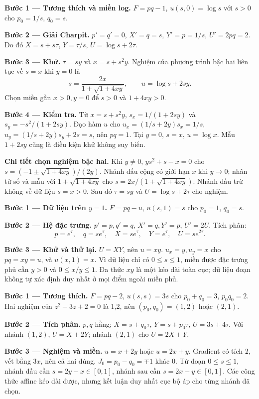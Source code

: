 \textbf{Bước 1 — Tương thích và miền log.} $F=pq-1$, $u(s,0)=\log s$ với $s>0$ cho $p_0=1/s$, $q_0=s$.

\textbf{Bước 2 — Giải Charpit.} $p'=q'=0$, $X'=q=s$, $Y'=p=1/s$, $U'=2pq=2$. Do đó $X=s+s\tau$, $Y=\tau/s$, $U=\log s+2\tau$.

\textbf{Bước 3 — Khử.} $\tau=sy$ và $x=s+s^2y$. Nghiệm của phương trình bậc hai liên tục về $s=x$ khi $y=0$ là
\[s=\frac{2x}{1+\sqrt{1+4xy}},\qquad u=\log s+2sy.\]
Chọn miền gần $x>0,y=0$ để $s>0$ và $1+4xy>0$.

\textbf{Bước 4 — Kiểm tra.} Từ $x=s+s^2y$, $s_x=1/(1+2sy)$ và $s_y=-s^2/(1+2sy)$. Đạo hàm $u$ cho $u_x=(1/s+2y)s_x=1/s$, $u_y=(1/s+2y)s_y+2s=s$, nên $pq=1$. Tại $y=0$, $s=x$, $u=\log x$. Mẫu $1+2sy$ cũng là điều kiện khử không suy biến.

\textbf{Chi tiết chọn nghiệm bậc hai.} Khi $y\ne0$, $ys^2+s-x=0$ cho $s=(-1\pm\sqrt{1+4xy})/(2y)$. Nhánh dấu cộng có giới hạn $x$ khi $y\to0$; nhân tử số và mẫu với $1+\sqrt{1+4xy}$ cho $s=2x/(1+\sqrt{1+4xy})$. Nhánh dấu trừ không về dữ liệu $s=x>0$. Sau đó $\tau=sy$ và $U=\log s+2\tau$ cho nghiệm.

\textbf{Bước 1 — Dữ liệu trên $y=1$.} $F=pq-u$, $u(s,1)=s$ cho $p_0=1$, $q_0=s$.

\textbf{Bước 2 — Hệ đặc trưng.} $p'=p,q'=q$, $X'=q,Y'=p$, $U'=2U$. Tích phân:
\[p=e^\tau,\quad q=se^\tau,\quad X=se^\tau,\quad Y=e^\tau,\quad U=se^{2\tau}.\]

\textbf{Bước 3 — Khử và thử lại.} $U=XY$, nên $u=xy$. $u_x=y,u_y=x$ cho $pq=xy=u$, và $u(x,1)=x$. Vì dữ liệu chỉ có $0\le s\le1$, miền được đặc trưng phủ cần $y>0$ và $0\le x/y\le1$. Đa thức $xy$ là một kéo dài toàn cục; dữ liệu đoạn không tự xác định duy nhất ở mọi điểm ngoài miền phủ.

\textbf{Bước 1 — Tương thích.} $F=pq-2$, $u(s,s)=3s$ cho $p_0+q_0=3$, $p_0q_0=2$. Hai nghiệm của $z^2-3z+2=0$ là 1,2, nên $(p_0,q_0)=(1,2)$ hoặc $(2,1)$.

\textbf{Bước 2 — Tích phân.} $p,q$ hằng; $X=s+q_0\tau$, $Y=s+p_0\tau$, $U=3s+4\tau$. Với nhánh $(1,2)$, $U=X+2Y$; nhánh $(2,1)$ cho $U=2X+Y$.

\textbf{Bước 3 — Nghiệm và miền.} $u=x+2y$ hoặc $u=2x+y$. Gradient có tích 2, vết bằng $3x$, nên cả hai đúng. $J_0=p_0-q_0=\mp1$ khác 0. Từ đoạn $0\le s\le1$, nhánh đầu cần $s=2y-x\in[0,1]$, nhánh sau cần $s=2x-y\in[0,1]$. Các công thức affine kéo dài được, nhưng kết luận duy nhất cục bộ áp cho từng nhánh đã chọn.

